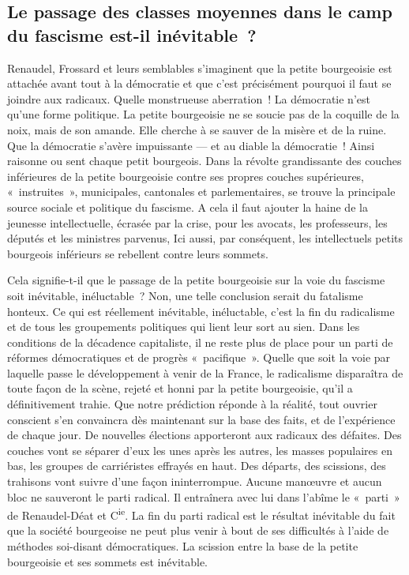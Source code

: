 \documentclass[french,twoside]{book} %
\begin{document}
\subsection[{Le passage des classes moyennes dans le camp du fascisme est-il inévitable ?}]{Le passage des classes moyennes dans le camp du fascisme est-il inévitable ?}
\noindent Renaudel, Frossard et leurs semblables s’imaginent que la petite bourgeoisie est attachée avant tout à la démocratie et que c’est précisément pourquoi il faut se joindre aux radicaux. Quelle monstrueuse aberration ! La démocratie n’est qu’une forme politique. La petite bourgeoisie ne se soucie pas de la coquille de la noix, mais de son amande. Elle cherche à se sauver de la misère et de la ruine. Que la démocratie s’avère impuissante — et au diable la démocratie ! Ainsi raisonne ou  sent chaque petit bourgeois. Dans la révolte grandissante des couches inférieures de la petite bourgeoisie contre ses propres couches supérieures, « instruites », municipales, cantonales et parlementaires, se trouve la principale source sociale et politique du fascisme. A cela il faut ajouter la haine de la jeunesse intellectuelle, écrasée par la crise, pour les avocats, les professeurs, les députés et les ministres parvenus, Ici aussi, par conséquent, les intellectuels petits bourgeois inférieurs se rebellent contre leurs sommets.\par
Cela signifie-t-il que le passage de la petite bourgeoisie sur la voie du fascisme soit inévitable, inéluctable ? Non, une telle conclusion serait du fatalisme honteux. Ce qui est réellement inévitable, inéluctable, c’est la fin du radicalisme et de tous les groupements politiques qui lient leur sort au sien. Dans les conditions de la décadence capitaliste, il ne reste plus de place pour un parti de réformes démocratiques et de progrès « pacifique ». Quelle que soit la voie par laquelle passe le développement à venir de la France, le radicalisme disparaîtra de toute façon de la scène, rejeté et honni par la petite bourgeoisie, qu’il a définitivement trahie. Que notre prédiction réponde à la réalité, tout ouvrier conscient s’en convaincra dès maintenant sur la base des faits, et de l’expérience de chaque jour. De nouvelles élections apporteront aux radicaux des défaites. Des couches vont se séparer d’eux les unes après les autres, les masses populaires en bas, les groupes de carriéristes effrayés en haut. Des départs, des scissions, des trahisons vont suivre d’une façon ininterrompue. Aucune manœuvre et aucun bloc ne sauveront le parti radical. Il entraînera avec lui dans l’abîme le « parti » de Renaudel-Déat et C\textsuperscript{ie}. La fin du parti radical est le résultat inévitable du fait que la société bourgeoise ne peut plus venir à bout de ses difficultés à l’aide de méthodes soi-disant démocratiques.  La scission entre la base de la petite bourgeoisie et ses sommets est inévitable.\par
\end{document}
